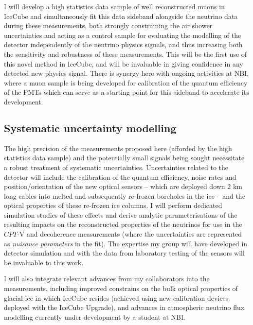 \documentclass[a4paper,11pt]{article}
\begin{document}
I will develop a high statistics data sample of well reconstructed muons in IceCube and simultaneously fit this data sideband alongside the neutrino data during these measurements, both strongly constraining the air shower uncertainties and acting as a control sample for evaluating the modelling of the detector independently of the neutrino physics signals, and thus increasing both the sensitivity and robustness of these measurements. This will be the first use of this novel method in IceCube, and will be invaluable in giving confidence in any detected new physics signal. There is synergy here with ongoing activities at NBI, where a muon sample is being developed for calibration of the quantum efficiency of the PMTs which can serve as a starting point for this sideband to accelerate its development.  \\



\subsection{Systematic uncertainty modelling}

The high precision of the measurements proposed here (afforded by the high statistics data sample) and the potentially small signals being sought necessitate a robust treatment of systematic uncertainties. Uncertainties related to the detector will include the calibration of the quantum efficiency, noise rates and position/orientation of the new optical sensors -- which are deployed down 2 km long cables into melted and subsequently re-frozen boreholes in the ice -- and the optical properties of these re-frozen ice columns. I will perform dedicated simulation studies of these effects and derive analytic parameterisations of the resulting impacts on the reconstructed properties of the neutrinos for use in the $CPT$-V and decoherence measurements (where the uncertainties are represented as \textit{nuisance parameters} in the fit). The expertise my group will have developed in detector simulation and with the data from laboratory testing of the sensors will be invaluable to this work.

I will also integrate relevant advances from my collaborators into the measurements, including improved constrains on the bulk optical properties of glacial ice in which IceCube resides (achieved using new calibration devices deployed with the IceCube Upgrade), and advances in atmospheric neutrino flux modelling currently under development by a student at NBI.
\end{document}
